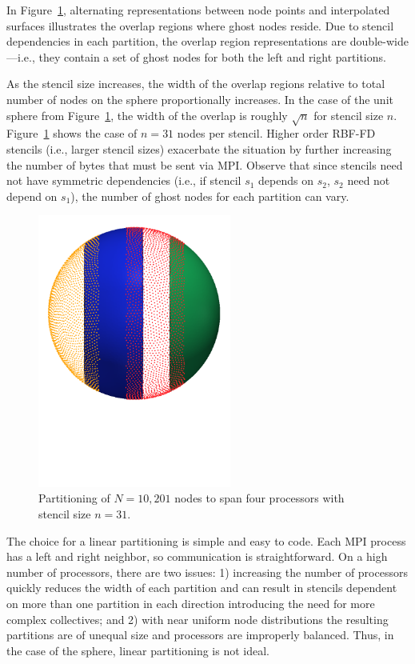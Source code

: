 \documentclass{report}
\begin{document}
In Figure~\ref{fig:decomposed_sphere}, alternating representations between node points and interpolated surfaces illustrates the
overlap regions where ghost nodes reside. Due to stencil dependencies in each partition, the overlap region representations are double-wide---i.e., they contain a set of ghost nodes for both the left and right partitions. 

As the stencil size increases, the width of the
overlap regions relative to total number of nodes on the sphere proportionally increases. In the case of the unit sphere from Figure~\ref{fig:decomposed_sphere}, the width of the overlap is roughly $\sqrt{n}$ for stencil size $n$. Figure~\ref{fig:decomposed_sphere} shows the case of $n=31$ nodes per stencil. Higher order RBF-FD stencils (i.e., larger stencil sizes) exacerbate the situation by further increasing the number of bytes that must be sent via MPI. Observe that since stencils need not have symmetric dependencies (i.e., if stencil $s_1$ depends on $s_2$, $s_2$ need not depend on $s_1$), the number of ghost nodes for each partition can vary.

\begin{figure}[ht!]
\begin{center}
\includegraphics[width=2.5in]{../figures/paper1/figures/vortex_rollup/4procs_N10K_n31.pdf}
\caption{Partitioning of $N=10,201$ nodes to span four processors with stencil size $n=31$. }
\label{fig:decomposed_sphere}
\end{center}
\end{figure}

The choice for a linear partitioning is simple and easy to code. Each MPI process has a left and right neighbor, so communication is straightforward. On a high number of processors, there are two issues: 1) increasing the number of processors quickly reduces the width of each partition and can result in stencils dependent on more than one partition in each direction introducing the need for more complex collectives; and 2) with near uniform node distributions the resulting partitions are of unequal size and processors are improperly balanced. Thus, in the case of the sphere, linear partitioning is not ideal. 
\end{document}
